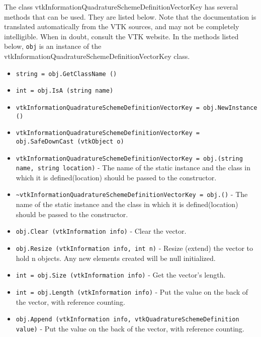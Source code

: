 The class vtkInformationQuadratureSchemeDefinitionVectorKey has several methods that can be used.
  They are listed below.
Note that the documentation is translated automatically from the VTK sources,
and may not be completely intelligible.  When in doubt, consult the VTK website.
In the methods listed below, \verb|obj| is an instance of the vtkInformationQuadratureSchemeDefinitionVectorKey class.
\begin{itemize}
\item  \verb|string = obj.GetClassName ()|

\item  \verb|int = obj.IsA (string name)|

\item  \verb|vtkInformationQuadratureSchemeDefinitionVectorKey = obj.NewInstance ()|

\item  \verb|vtkInformationQuadratureSchemeDefinitionVectorKey = obj.SafeDownCast (vtkObject o)|

\item  \verb|vtkInformationQuadratureSchemeDefinitionVectorKey = obj.(string name, string location)| -  The name of the static instance and the class in which
 it is defined(location) should be passed to the constructor.

\item  \verb|~vtkInformationQuadratureSchemeDefinitionVectorKey = obj.()| -  The name of the static instance and the class in which
 it is defined(location) should be passed to the constructor.


\item  \verb|obj.Clear (vtkInformation info)| -  Clear the vector.

\item  \verb|obj.Resize (vtkInformation info, int n)| -  Resize (extend) the vector to hold n objects. Any new elements
 created will be null initialized.

\item  \verb|int = obj.Size (vtkInformation info)| -  Get the vector's length.

\item  \verb|int = obj.Length (vtkInformation info)| -  Put the value on the back of the vector, with reference counting.

\item  \verb|obj.Append (vtkInformation info, vtkQuadratureSchemeDefinition value)| -  Put the value on the back of the vector, with reference counting.


\end{itemize}
